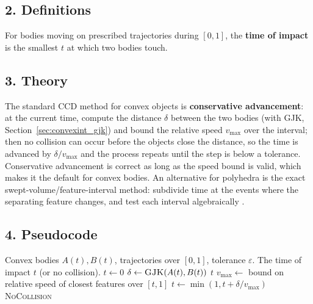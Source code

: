 \subsection{2. Definitions}

\begin{definition}\label{def:convexint_toi}
  For bodies moving on prescribed trajectories during $[0,1]$, the
  \textbf{time of impact} is the smallest $t$ at which two bodies touch.
\end{definition}

\subsection{3. Theory}

The standard CCD method for convex objects is \textbf{conservative
advancement}: at the current time, compute the distance $\delta$ between
the two bodies (with GJK, Section~\ref{sec:convexint_gjk}) and bound the
relative speed $v_{\max}$ over the interval; then no collision can occur
before the objects close the distance, so the time is advanced by
$\delta / v_{\max}$ and the process repeats until the step is below a
tolerance. Conservative advancement is correct as long as the speed bound
is valid, which makes it the default for convex bodies. An alternative for
polyhedra is the exact swept-volume/feature-interval method: subdivide time
at the events where the separating feature changes, and test each interval
algebraically \cite{ericson2004}.

\subsection{4. Pseudocode}

\begin{algorithm}[htbp]
\caption{Conservative Advancement (Time of Impact)}
\label{alg:convexint_ccd}
\begin{algorithmic}[1]
\Require Convex bodies $A(t), B(t)$, trajectories over $[0,1]$, tolerance $\varepsilon$.
\Ensure The time of impact $t$ (or no collision).
  \State $t \gets 0$
    \State $\delta \gets \textsc{GJK}(A(t), B(t))$
    \If{$\delta \le \varepsilon$} \State \Return $t$ \EndIf
    \State $v_{\max} \gets$ bound on relative speed of closest features over $[t,1]$
    \State $t \gets \min(1, t + \delta / v_{\max})$
  \EndWhile
  \State \Return \textsc{NoCollision}
\EndFunction
\end{algorithmic}
\end{algorithm}

